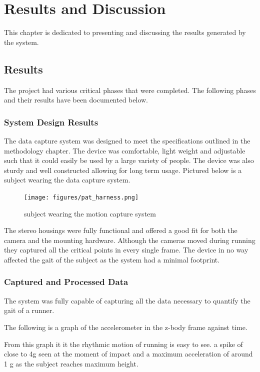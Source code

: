 \chapter{Results and Discussion}
This chapter is dedicated to presenting and discussing the results generated by the system. 

\section{Results}
The project had various critical phases that were completed. The following phases and their results have been documented below.

\subsection{System Design Results}
The data capture system was designed to meet the specifications outlined in the methodology chapter. The device was comfortable, light weight and adjustable such that it could easily be used by a large variety of people. The device was also sturdy and well constructed allowing for long term usage. Pictured below is a subject wearing the data capture system.

\begin{figure}[!ht] 
\captionsetup{width=0.5\linewidth, font=small}  
\texttt{[image: figures/pat\_harness.png]}
\caption{subject wearing the motion capture system }
\label{fig:pat_harness}
\end{figure}

The stereo housings were fully functional and offered a good fit for both the camera and the mounting hardware. Although the cameras moved during running they captured all the critical points in every single frame. The device in no way affected the gait of the subject as the system had a minimal footprint.



\subsection{Captured and Processed Data}
The system was fully capable of capturing all the data necessary to quantify the gait of a runner. 

The following is a graph of the accelerometer in the z-body frame against time.

From this graph it it the rhythmic motion of running is easy to see. a spike of close to 4g seen at the moment of impact and a maximum acceleration of around 1 g as the subject reaches maximum height.

